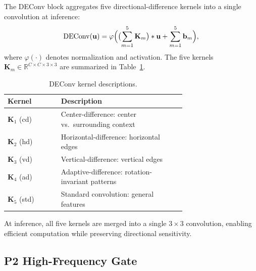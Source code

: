 \documentclass{article}
\theoremstyle{plain}
\theoremstyle{definition}
\theoremstyle{remark}
\begin{document}
The DEConv block aggregates five directional-difference kernels into a single convolution at inference:
\vspace{-0.2cm}
\begin{equation}
\label{eq:deconv_appendix}
\mathrm{DEConv}(\mathbf{u}) = \varphi\Bigl(\bigl(\sum_{m=1}^{5} \mathbf{K}_{m}\bigr) * \mathbf{u} + \sum_{m=1}^{5}\mathbf{b}_{m}\Bigr),
\vspace{-0.2cm}
\end{equation}
where $\varphi(\cdot)$ denotes normalization and activation. The five kernels $\mathbf{K}_{m}\in\mathbb{R}^{C\times C\times 3\times 3}$ are summarized in Table~\ref{tab:deconv_kernels}.

\begin{table}[h]
\centering
\caption{DEConv kernel descriptions.}
\label{tab:deconv_kernels}
\begin{tabular}{@{}l>{\raggedright\arraybackslash}p{0.70\linewidth}@{}}
 \toprule
 \cellcolor{blue!5}\textbf{Kernel} & \cellcolor{blue!5}\textbf{Description} \\
 \midrule
 $\mathbf{K}_1$ (cd) & Center-difference: center vs.\ surrounding context \\
 $\mathbf{K}_2$ (hd) & Horizontal-difference: horizontal edges \\
 $\mathbf{K}_3$ (vd) & Vertical-difference: vertical edges \\
 $\mathbf{K}_4$ (ad) & Adaptive-difference: rotation-invariant patterns \\
$\mathbf{K}_5$ (std) & Standard convolution: general features \\
\bottomrule
\end{tabular}
\end{table}
At inference, all five kernels are merged into a single $3{\times}3$ convolution, enabling efficient computation while preserving directional sensitivity.

\subsection{P2 High-Frequency Gate}
\end{document}
